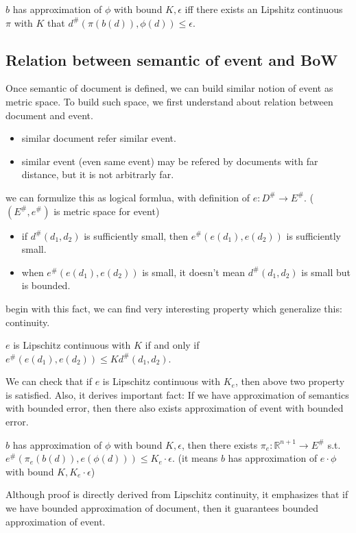 \begin{definition}
    $b$ has approximation of $\phi$ with bound $K, \epsilon$ iff there exists an Lipshitz continuous $\pi$ with $K$ that $d^{\#}(\pi(b(d)), \phi(d)) \leq \epsilon$.
\end{definition}

\subsection{Relation between semantic of event and BoW}
Once semantic of document is defined, we can build similar notion of event as metric space. To build such space, we first understand about
relation between document and event.
\begin{itemize}
    \item similar document refer similar event.
    \item similar event (even same event) may be refered by documents with far distance, but it is not arbitrarly far.
\end{itemize}
we can formulize this as logical formlua, with definition of $e: D^{\#} \rightarrow E^{\#}$. ($(E^{\#}, e^{\#})$ is metric space for event)
\begin{itemize}
    \item if $d^{\#}(d_{1}, d_{2})$ is sufficiently small, then $e^{\#}(e(d_{1}), e(d_{2}))$ is sufficiently small.
    \item when $e^{\#}(e(d_{1}), e(d_{2}))$ is small, it doesn't mean $d^{\#}(d_{1}, d_{2})$ is small but is bounded.
\end{itemize}
begin with this fact, we can find very interesting property which generalize this: continuity.
\begin{definition}
    $e$ is Lipschitz continuous with $K$ if and only if\\ $e^{\#}(e(d_{1}), e(d_{2})) \leq K d^{\#}(d_{1}, d_{2})$.
\end{definition}

We can check that if $e$ is Lipschitz continuous with $K_{e}$, then above two property is satisfied. Also, it derives important fact:
If we have approximation of semantics with bounded error, then there also exists approximation of event with bounded error.
\begin{theorem}
    $b$ has approximation of $\phi$ with bound $K, \epsilon$, then there exists $\pi_{e}: \mathbb{R}^{n+1} \rightarrow E^{\#}$ s.t.
    $e^{\#}(\pi_{e}(b(d)), e(\phi(d))) \leq K_{e} \cdot \epsilon$. (it means $b$ has approximation of $e \cdot \phi$ with bound $K, K_{e} \cdot \epsilon$)
\end{theorem}
Although proof is directly derived from Lipschitz continuity, it emphasizes that if we have bounded approximation of document, then it guarantees
bounded approximation of event.

